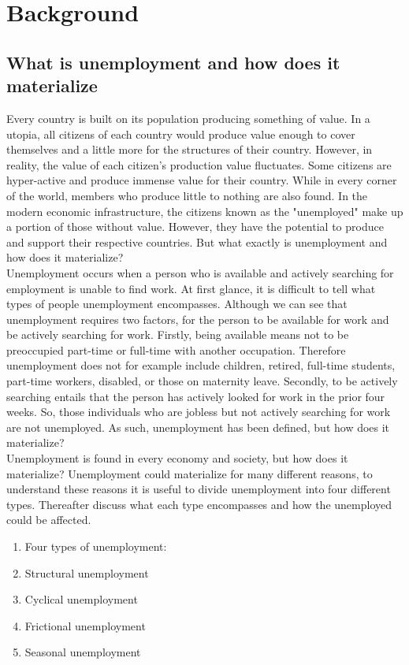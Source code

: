 \section{Background}\label{ch:background}

\subsection{What is unemployment and how does it materialize} \label{What is unemployment and how does it materialize}
Every country is built on its population producing something of value. 
In a utopia, all citizens of each country would produce value enough to cover themselves and a little more for the structures of their country.
However, in reality, the value of each citizen's production value fluctuates. 
Some citizens are hyper-active and produce immense value for their country.
While in every corner of the world, members who produce little to nothing are also found. 
In the modern economic infrastructure, the citizens known as the "unemployed" make up a portion of those without value.
However, they have the potential to produce and support their respective countries.
But what exactly is unemployment and how does it materialize? \\

Unemployment occurs when a person who is available and actively searching for employment is unable to find work. \cite{Guide_to_unemployment} 
At first glance, it is difficult to tell what types of people unemployment encompasses.
Although we can see that unemployment requires two factors, for the person to be available for work and be actively searching for work.
Firstly, being available means not to be preoccupied part-time or full-time with another occupation.
Therefore unemployment does not for example include children, retired, full-time students, part-time workers, disabled, or those on maternity leave.
Secondly, to be actively searching entails that the person has actively looked for work in the prior four weeks. \cite{US_unemployment_statistics_definition} 
So, those individuals who are jobless but not actively searching for work are not unemployed.
As such, unemployment has been defined, but how does it materialize? \\

Unemployment is found in every economy and society, but how does it materialize?
Unemployment could materialize for many different reasons, to understand these reasons it is useful to divide unemployment into four different types.
Thereafter discuss what each type encompasses and how the unemployed could be affected.
\begin{enumerate}
   \item Four types of unemployment:
   \item  Structural unemployment
   \item  Cyclical unemployment
   \item  Frictional unemployment
   \item  Seasonal unemployment\cite{Four_types_of_unemployment}
\end{enumerate}

